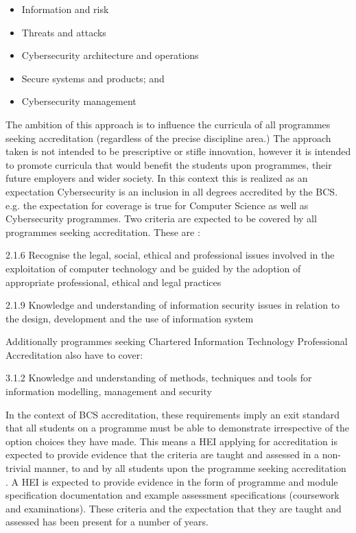 \documentclass[sigconf,anonymous]{acmart}
\begin{document}
\begin{itemize}
    \item Information and risk 
    \item Threats and attacks 
    \item Cybersecurity architecture and operations
    \item Secure systems and products; and 
    \item Cybersecurity management
\end{itemize}

The ambition of this approach is to influence the curricula of all programmes seeking accreditation (regardless of the precise discipline area.)  The approach taken is not intended to be prescriptive or stifle innovation, however it is intended to promote curricula that would benefit the students upon programmes, their future employers and wider society.  In this context this is realized as an expectation Cybersecurity is an inclusion in all degrees accredited by the BCS. e.g. the expectation for coverage is true for Computer Science as well as Cybersecurity programmes. Two criteria are expected to be covered by all programmes seeking accreditation. These are \cite{BCS2018a}:

2.1.6 Recognise the legal, social, ethical and professional issues involved in the exploitation of computer technology and be guided by the adoption of appropriate professional, ethical and legal practices

2.1.9 Knowledge and understanding of information security issues in relation to the design, development and the use of information system

Additionally programmes seeking Chartered Information Technology Professional Accreditation also have to cover:

3.1.2 Knowledge and understanding of methods, techniques and tools for information modelling, management and security

In the context of BCS accreditation, these requirements imply an exit standard that all students on a programme must be able to demonstrate irrespective of the option choices they have made. This means a HEI applying for accreditation is expected to provide evidence that the criteria are taught and assessed in a non-trivial manner, to and by all students upon the programme seeking accreditation . A HEI is expected to provide evidence in the form of programme and module specification documentation and example assessment specifications (coursework and examinations). These criteria and the expectation that they are taught and assessed has been present for a number of years.
\end{document}
